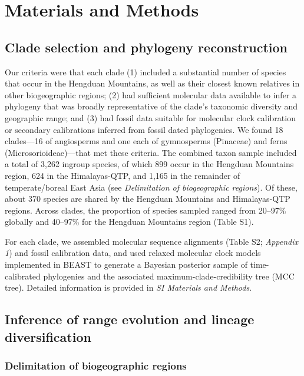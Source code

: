 \section{Materials and Methods}

\subsection{Clade selection and phylogeny reconstruction}

Our criteria were that each clade (1) included a substantial number of species that occur in the Hengduan Mountains, as well as their closest known relatives in other biogeographic regions; (2) had sufficient molecular data available to infer a phylogeny that was broadly representative of the clade's taxonomic diversity and geographic range; and (3) had fossil data suitable for molecular clock calibration or secondary calibrations inferred from fossil dated phylogenies. We found 18 clades---16 of angiosperms and one each of gymnosperms (Pinaceae) and ferns (Microsorioideae)---that met these criteria. The combined taxon sample included a total of 3,262 ingroup species, of which 899 occur in the Hengduan Mountains region, 624 in the Himalayas-QTP, and 1,165 in the remainder of temperate/boreal East Asia (see \textit{Delimitation of biogeographic regions}). Of these, about 370 species are shared by the Hengduan Mountains and Himalayas-QTP regions. Across clades, the proportion of species sampled ranged from 20--97\% globally and 40--97\% for the Hengduan Mountains region (Table S1).

For each clade, we assembled molecular sequence alignments (Table S2; \textit{Appendix 1}) and fossil calibration data, and used relaxed molecular clock models implemented in BEAST \citep{Drummond2012,Bouckaert2014} to generate a Bayesian posterior sample of time-calibrated phylogenies and the associated maximum-clade-credibility tree (MCC tree).  Detailed information is provided in \textit{SI Materials and Methods}.


\subsection{Inference of range evolution and lineage diversification}

\subsubsection{Delimitation of biogeographic regions}

